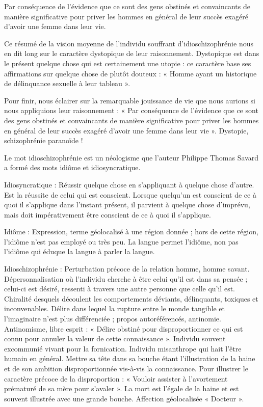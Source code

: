 \documentclass[12pt,oneside]{article}
\begin{document}
Par conséquence de l'évidence que ce sont des gens obstinés et convaincants de manière significative pour priver les hommes en général de leur succès exagéré d'avoir une femme dans leur vie.

Ce résumé de la vision moyenne de l'individu souffrant d'idioschizophrénie nous en dit long sur le caractère dystopique de leur raisonnement. Dystopique est dans le présent quelque chose qui est certainement une utopie : ce caractère base ses affirmations sur quelque chose de plutôt douteux : « Homme ayant un historique de délinquance sexuelle à leur tableau ».

Pour finir, nous éclairer sur la remarquable jouissance de vie que nous aurions si nous appliquions leur raisonnement : « Par conséquence de l'évidence que ce sont des gens obstinés et convaincants de manière significative pour priver les hommes en général de leur succès exagéré d'avoir une femme dans leur vie ». Dystopie, schizophrénie paranoïde !

Le mot idioschizophrénie est un néologisme que l'auteur Philippe Thomas Savard a formé des mots idiôme et idiosyncratique.

Idiosyncratique : Réussir quelque chose en s'appliquant à quelque chose d'autre. Est la réussite de celui qui est conscient. Lorsque quelqu'un est conscient de ce à quoi il s'applique dans l'instant présent, il parvient à quelque chose d'imprévu, mais doit impérativement être conscient de ce à quoi il s'applique.

Idiôme : Expression, terme géolocalisé à une région donnée ; hors de cette région, l'idiôme n'est pas employé ou très peu. La langue permet l'idiôme, non pas l'idiôme qui éduque la langue à parler la langue.

Idioschizophrénie : Perturbation précoce de la relation homme, homme savant. Dépersonnalisation où l'individu cherche à être celui qu'il est dans sa pensée ; celui-ci est désiré, ressenti à travers une autre personne que celle qu'il est. Chiralité desquels découlent les comportements déviants, délinquants, toxiques et inconvenables. Délire dans lequel la rupture entre le monde tangible et l'imaginaire n'est plus différenciée ; propos autoréférencés, antinomie. Antinomisme, libre esprit : « Délire obstiné pour disproportionner ce qui est connu pour annuler la valeur de cette connaissance ». Individu souvent excommunié vivant pour la fornication. Individu misanthrope qui hait l'être humain en général. Mettre sa tête dans sa bouche étant l'illustration de la haine et de son ambition disproportionnée vis-à-vis la connaissance. Pour illustrer le caractère précoce de la disproportion : « Vouloir assister à l'avortement prématuré de sa mère pour s'avaler ». La mort est l'égale de la haine et est souvent illustrée avec une grande bouche. Affection géolocalisée « Docteur ».
\end{document}
